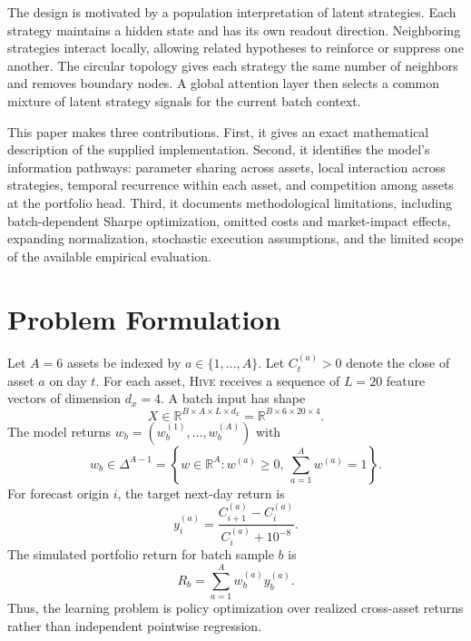 \documentclass[10pt,a4paper,twocolumn]{article}
\newcommand{\R}{\mathbb{R}}
\newcommand{\Hive}{\textsc{Hive}}
\begin{document}
The design is motivated by a population interpretation of latent strategies. Each strategy maintains a hidden state and has its own readout direction. Neighboring strategies interact locally, allowing related hypotheses to reinforce or suppress one another. The circular topology gives each strategy the same number of neighbors and removes boundary nodes. A global attention layer then selects a common mixture of latent strategy signals for the current batch context.

This paper makes three contributions. First, it gives an exact mathematical
description of the supplied implementation. Second, it identifies the model's
information pathways: parameter sharing across assets, local interaction across
strategies, temporal recurrence within each asset, and competition among assets
at the portfolio head. Third, it documents methodological limitations, including
batch-dependent Sharpe optimization, omitted costs and market-impact effects,
expanding normalization, stochastic execution assumptions, and the limited
scope of the available empirical evaluation.

\section{Problem Formulation}
Let $A=6$ assets be indexed by $a\in\{1,\ldots,A\}$. Let $C_t^{(a)}>0$ denote the close of asset $a$ on day $t$. For each asset, \Hive{} receives a sequence of $L=20$ feature vectors of dimension $d_x=4$. A batch input has shape
\begin{equation}
X\in\R^{B\times A\times L\times d_x}=\R^{B\times6\times20\times4}.
\end{equation}
The model returns $w_b=(w_b^{(1)},\ldots,w_b^{(A)})$ with
\begin{equation}
w_b\in\Delta^{A-1}=\left\{w\in\R^A:w^{(a)}\geq0,\ \sum_{a=1}^{A}w^{(a)}=1\right\}.
\end{equation}
For forecast origin $i$, the target next-day return is
\begin{equation}
y_i^{(a)}=\frac{C_{i+1}^{(a)}-C_i^{(a)}}{C_i^{(a)}+10^{-8}}.
\end{equation}
The simulated portfolio return for batch sample $b$ is
\begin{equation}
R_b=\sum_{a=1}^{A}w_b^{(a)}y_b^{(a)}.
\end{equation}
Thus, the learning problem is policy optimization over realized cross-asset returns rather than independent pointwise regression.
\end{document}
